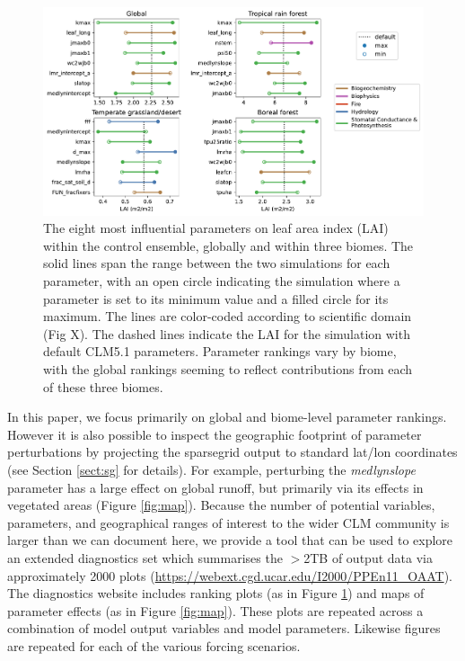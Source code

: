 \documentclass[draft]{agujournal2019}
\begin{document}
\begin{figure}[h]
\centering
\includegraphics[width=\textwidth]{../figs/lai_biome.pdf}
\caption{The eight most influential parameters on leaf area index (LAI) within the control ensemble, globally and within three biomes. The solid lines span the range between the two simulations for each parameter, with an open circle indicating the simulation where a parameter is set to its minimum value and a filled circle for its maximum. The lines are color-coded according to scientific domain (Fig X). The dashed lines indicate the LAI for the simulation with default CLM5.1 parameters. Parameter rankings vary by biome, with the global rankings seeming to reflect contributions from each of these three biomes.}
\label{fig:lai}
\end{figure}

In this paper, we focus primarily on global and biome-level parameter rankings. However it is also possible to inspect the geographic footprint of parameter perturbations by projecting the sparsegrid output to standard lat/lon coordinates (see Section \ref{sect:sg} for details). For example, perturbing the \textit{medlynslope} parameter has a large effect on global runoff, but primarily via its effects in vegetated areas (Figure \ref{fig:map}). 
Because the number of potential variables, parameters, and geographical ranges of interest to the wider CLM community is larger than we can document here,  we provide a tool that can be used to explore an extended diagnostics set which summarises the $>$2TB of output data via approximately 2000 plots (\url{https://webext.cgd.ucar.edu/I2000/PPEn11_OAAT}). The diagnostics website includes ranking plots (as in Figure \ref{fig:lai}) and maps of parameter effects (as in Figure \ref{fig:map}). These plots are repeated across a combination of model output variables and model parameters. Likewise figures are repeated for each of the various forcing scenarios. 
\end{document}
